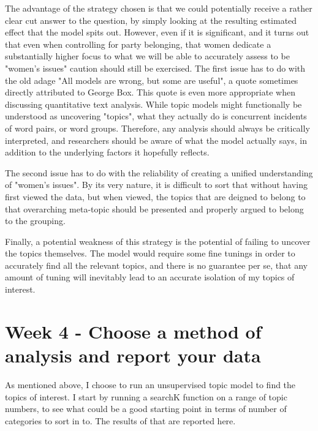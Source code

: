 \documentclass[12pt]{article}
\begin{document}
	The advantage of the strategy chosen is that we could potentially receive a rather clear cut answer to the question, by simply looking at the resulting estimated effect that the model spits out. However, even if it is significant, and it turns out that even when controlling for party belonging, that women dedicate a substantially higher focus to what we will be able to accurately assess to be "women's issues" caution should still be exercised. The first issue has to do with the old adage "All models are wrong, but some are useful", a quote sometimes directly attributed to George Box. This quote is even more appropriate when discussing quantitative text analysis. While topic models might functionally be understood as uncovering "topics", what they actually do is concurrent incidents of word pairs, or word groups. Therefore, any analysis should always be critically interpreted, and researchers should be aware of what the model actually says, in addition to the underlying factors it hopefully reflects.
	
	The second issue has to do with the reliability of creating a unified understanding of "women's issues". By its very nature, it is difficult to sort that without having first viewed the data, but when viewed, the topics that are deigned to belong to that overarching meta-topic should be presented and properly argued to belong to the grouping. 
	
	Finally, a potential weakness of this strategy is the potential of failing to uncover the topics themselves. The model would require some fine tunings in order to accurately find all the relevant topics, and there is no guarantee per se, that any amount of tuning will inevitably lead to an accurate isolation of my topics of interest. 
	
	\section{Week 4 - Choose a method of analysis and report your data}
	
	As mentioned above, I choose to run an unsupervised topic model to find the topics of interest. I start by running a searchK function on a range of topic numbers, to see what could be a good starting point in terms of number of categories to sort in to. The results of that are reported here. 
	
\end{document}
